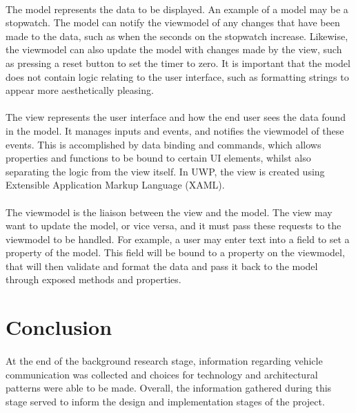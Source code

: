 	\paragraph{}{
	The model represents the data to be displayed. An example of a model may be a stopwatch. The model can notify the viewmodel of any changes that have been made to the data, such as when the seconds on the stopwatch increase. Likewise, the viewmodel can also update the model with changes made by the view, such as pressing a reset button to set the timer to zero. It is important that the model does not contain logic relating to the user interface, such as formatting strings to appear more aesthetically pleasing.
	}
	\paragraph{}{
	The view represents the user interface and how the end user sees the data found in the model. It manages inputs and events, and notifies the viewmodel of these events. This is accomplished by data binding and commands, which allows properties and functions to be bound to certain UI elements, whilst also separating the logic from the view itself. In UWP, the view is created using Extensible Application Markup Language (XAML).
	}
	\paragraph{}{
	The viewmodel is the liaison between the view and the model. The view may want to update the model, or vice versa, and it must pass these requests to the viewmodel to be handled. For example, a  user may enter text into a field to set a property of the model. This field will be bound to a property on the viewmodel, that will then validate and format the data and pass it back to the model through exposed methods and properties.
	}
	
\section{Conclusion}
	\paragraph{}{
	At the end of the background research stage, information regarding vehicle communication was collected and choices for technology and architectural patterns were able to be made. Overall, the information gathered during this stage served to inform the design and implementation stages of the project.
	}
